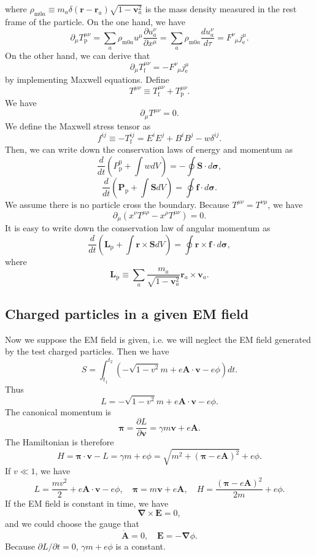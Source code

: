 where $\rho_{\mathrm{m}0a} \equiv m_a \delta(\bm{r}-\bm{r}_a) \sqrt{1-\bm{v}_a^2}$ is the mass density measured in the rest frame of the particle.
On the one hand, we have
\[\partial_{\mu} T_{\mathrm{p}}^{\mu\nu} = \sum_a \rho_{\mathrm{m}0a}u^{\mu} \frac{\partial u_a^{\nu}}{\partial x^{\mu}} = \sum_a \rho_{\mathrm{m}0a} \frac{d u_a^{\nu}}{d \tau} = F^{\nu}_{\phantom{\nu}\mu}j_{\mathrm{e}}^{\mu}.\]
On the other hand, we can derive that
\[\partial_{\mu} T_{\mathrm{f}}^{\mu\nu} = - F^{\nu}_{\phantom{\nu}\mu}j_{\mathrm{e}}^{\mu}\]
by implementing Maxwell equations.
Define
\[T^{\mu \nu} \equiv T_{\mathrm{f}}^{\mu\nu} + T_{\mathrm{p}}^{\mu\nu}.\]
We have
\[\partial_{\mu} T^{\mu\nu} = 0.\]
We define the Maxwell stress tensor as
\[f^{ij} \equiv -T_{\mathrm{f}}^{ij} = E^{i}E^{j} + B^{i}B^{j} - w\delta^{ij}.\]
Then, we can write down the conservation laws of energy and momentum as
\[\frac{d}{dt}\left(P_{\mathrm{p}}^0 + \int w dV \right) = -\oint \bm{S}\cdot d\bm{\sigma},\]
\[\frac{d}{dt}\left(\bm{P}_{\mathrm{p}} + \int \bm{S} dV \right) = \oint \bm{f}\cdot d\bm{\sigma}.\]
We assume there is no particle cross the boundary.
Because $T^{\mu\nu} = T^{\nu\mu}$, we have
\[\partial_{\mu}(x^{\nu}T^{\mu\rho}-x^{\rho}T^{\mu\nu}) = 0.\]
It is easy to write down the conservation law of angular momentum as
\[\frac{d}{dt}\left(\bm{L}_{\mathrm{p}} + \int \bm{r} \times \bm{S} dV \right) = \oint \bm{r} \times \bm{f}\cdot d\bm{\sigma},\]
where
\[\bm{L}_{\mathrm{p}} \equiv \sum_a \frac{m_a}{\sqrt{1-\bm{v}_a^2}} \bm{r}_a  \times \bm{v}_a .\]

\subsection{Charged particles in a given EM field}
Now we suppose the EM field is given, i.e. we will neglect the EM field generated by the test charged particles. Then we have
\[S = \int_{t_1}^{t_2} (-\sqrt{1-v^2}m + e\bm{A}\cdot\bm{v}-e\phi)dt.\]
Thus
\[L = -\sqrt{1-v^2}m + e\bm{A}\cdot\bm{v}-e\phi.\]
The canonical momentum is
\[\bm{\pi} = \frac{\partial L}{\partial \bm{v}} = \gamma m \bm{v} + e \bm{A}.\]
The Hamiltonian is therefore
\[H = \bm{\pi} \cdot \bm{v} - L = \gamma m + e \phi = \sqrt{m^2+(\bm{\pi}-e\bm{A})^2}+e\phi.\]
If $v \ll 1$, we have
\[L = \frac{mv^2}{2} + e\bm{A}\cdot\bm{v}-e\phi , \quad \bm{\pi} =  m \bm{v} + e \bm{A} , \quad H = \frac{(\bm{\pi}-e\bm{A})^2}{2m}+e\phi.\]
If the EM field is constant in time, we have
\[\bm{\nabla} \times \bm{E} = 0 ,\]
and we could choose the gauge that
\[\dot{\bm{A}} = 0 , \quad \bm{E} = -\bm{\nabla} \phi.\]
Because $\partial L/{\partial t}=0$, $\gamma m + e\phi$ is a constant.

